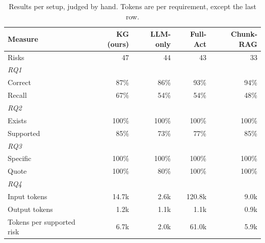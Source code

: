 \begin{table}[t]
\centering
\footnotesize
\setlength{\tabcolsep}{4pt}
\caption{Results per setup, judged by hand. Tokens are per requirement, except the last row.}
\label{tab:results}
\begin{tabular}{lrrrr}
\hline
Measure & KG (ours) & LLM-only & Full-Act & Chunk-RAG \\
\hline
Risks & 47 & 44 & 43 & 33 \\
\multicolumn{5}{l}{\textit{RQ1}} \\
\quad Correct & 87\% & 86\% & 93\% & 94\% \\
\quad Recall & 67\% & 54\% & 54\% & 48\% \\
\multicolumn{5}{l}{\textit{RQ2}} \\
\quad Exists & 100\% & 100\% & 100\% & 100\% \\
\quad Supported & 85\% & 73\% & 77\% & 85\% \\
\multicolumn{5}{l}{\textit{RQ3}} \\
\quad Specific & 100\% & 100\% & 100\% & 100\% \\
\quad Quote & 100\% & 80\% & 100\% & 100\% \\
\multicolumn{5}{l}{\textit{RQ4}} \\
\quad Input tokens & 14.7k & 2.6k & 120.8k & 9.0k \\
\quad Output tokens & 1.2k & 1.1k & 1.1k & 0.9k \\
\quad Tokens per supported risk & 6.7k & 2.0k & 61.0k & 5.9k \\
\hline
\end{tabular}
\end{table}
